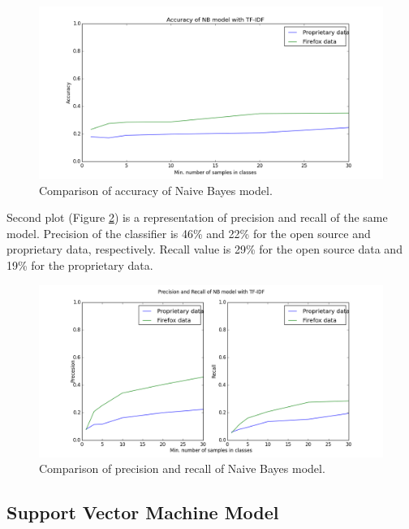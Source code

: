 \begin{figure}[htbp]
    \centering
        \includegraphics[width=\textwidth]{./images/prop_vs_os/nb_accuracy.png}
    \caption{Comparison of accuracy of Naive Bayes model.}
    \label{fig:results.datasets.nb_accuracy}
\end{figure}

Second plot (Figure \ref{fig:results.datasets.nb_pr}) is a representation of precision and recall of the same model. Precision of the classifier is 46\% and 22\% for the open source and proprietary data, respectively. Recall value is 29\% for the open source data and 19\% for the proprietary data.

\begin{figure}[htbp]
    \centering
        \includegraphics[width=\textwidth]{./images/prop_vs_os/nb_precision_and_recall.png}
    \caption{Comparison of precision and recall of Naive Bayes model.}
    \label{fig:results.datasets.nb_pr}
\end{figure}

\subsection{Support Vector Machine Model}

